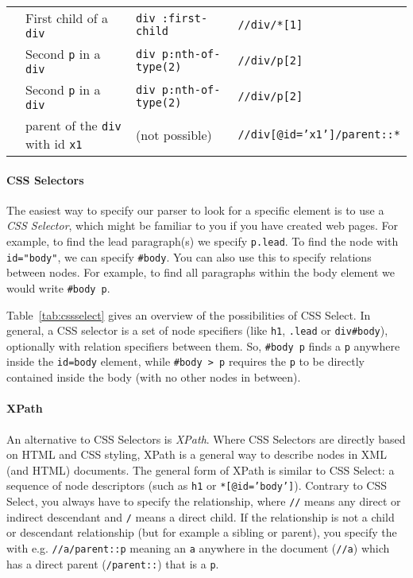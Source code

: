 \begin{table}
{\begin{tabularx}{\textwidth}{llll}
{& First child of a \texttt{\small{div}} & \texttt{\small{div :first-child}} & \texttt{\small{//div/*[1]}} \\
& Second \texttt{\small{p}} in a \texttt{\small{div}} & \texttt{\small{div p:nth-of-type(2)}} & \texttt{\small{//div/p[2]}} \\
& Second \texttt{\small{p}} in a \texttt{\small{div}} & \texttt{\small{div p:nth-of-type(2)}} & \texttt{\small{//div/p[2]}} \\
& parent of the \texttt{\small{div}} with id \texttt{\small{x1}} & (not possible) & \texttt{\small{//div[@id='x1']/parent::*}} \\
\bottomrule
  \end{tabularx}}{}
  \end{table}


\paragraph{CSS Selectors} The easiest way to specify our parser to look for a specific element is to use a \emph{CSS Selector},
which might be familiar to you if you have created web pages.
For example, to find the lead paragraph(s) we specify \texttt{\small{p.lead}}.
To find the node with \texttt{\small{id="body"}}, we can specify \texttt{\small{\#body}}.
You can also use this to specify relations between nodes. For example,
to find all paragraphs within the body element we would write \texttt{\small{\#body p}}.

Table~\ref{tab:cssselect} gives an overview of the possibilities of CSS Select.
In general, a CSS selector is a set of node specifiers (like \texttt{\small{h1}}, \texttt{\small{.lead}} or \texttt{\small{div\#body}}),
optionally with relation specifiers between them.
So, \texttt{\small{\#body p}} finds a \texttt{\small{p}} anywhere inside the \texttt{\small{id=body}} element,
while \texttt{\small{\#body > p}} requires the \texttt{\small{p}} to be directly contained inside the body
(with no other nodes in between).

\paragraph{XPath}
An alternative to CSS Selectors is \emph{XPath}.
Where CSS Selectors are directly based on HTML and CSS styling,
XPath is a general way to describe nodes in XML (and HTML) documents.
The general form of XPath is similar to CSS Select:
a sequence of node descriptors (such as \texttt{\small{h1}} or \texttt{\small{*[@id='body']}}).
Contrary to CSS Select, you always have to specify the relationship, where
\texttt{\small{//}} means any direct or indirect descendant and \texttt{\small{/}} means a direct child.
If the relationship is not a child or descendant relationship (but for example a sibling or parent),
you specify the  with e.g. \texttt{\small{//a/parent::p}} meaning an \texttt{\small{a}} anywhere in the document (\texttt{\small{//a}}) which has a direct parent (\texttt{\small{/parent::}}) that is a \texttt{\small{p}}.

